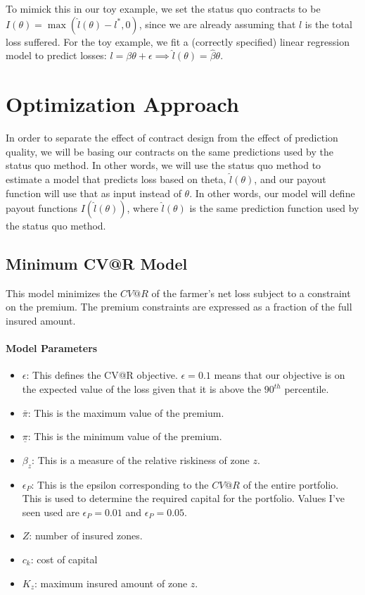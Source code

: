 \documentclass[11pt]{article}
\begin{document}
To mimick this in our toy example, we set the status quo contracts to be $I(\theta) = \max(\hat{l}(\theta)-l^*,0)$, since we are already assuming that $l$ is the total loss suffered. For the toy example, we fit a (correctly specified) linear regression model to predict losses: $l = \beta \theta + \epsilon \implies \hat{l}(\theta) = \hat{\beta}\theta$. 

\section{Optimization Approach}
In order to separate the effect of contract design from the effect of prediction quality, we will be basing our contracts on the same predictions used by the status quo method. In other words, we will use the status quo method to estimate a model that predicts loss based on theta, $\hat{l}(\theta)$, and our payout function will use that as input instead of $\theta$. In other words, our model will define payout functions $I(\hat{l}(\theta))$, where $\hat{l}(\theta)$ is the same prediction function used by the status quo method. 

\subsection*{Minimum CV@R Model}
    This model minimizes the $CV@R$ of the farmer's net loss subject to a constraint on the premium. The premium constraints are expressed as a fraction of the full insured amount. 
    \paragraph*{Model Parameters}
    \begin{itemize}
        \item $\epsilon$: This defines the CV@R objective. $\epsilon = 0.1$ means that our objective is on the expected value of the loss given that it is above the $90^{th}$ percentile. 
        \item $\bar{\pi}$: This is the maximum value of the premium. 
        \item $\underline{\pi}$: This is the minimum value of the premium. 
        \item $\beta_z$: This is a measure of the relative riskiness of zone $z$. 
        \item $\epsilon_P$: This is the epsilon corresponding to the $CV@R$ of the entire portfolio. This is used to determine the required capital for the portfolio. Values I've seen used are $\epsilon_P=0.01$ and $\epsilon_P=0.05$. 
        \item $Z$: number of insured zones.
        \item $c_k$: cost of capital
        \item $K_z$: maximum insured amount of zone $z$.  
    \end{itemize}
\end{document}
